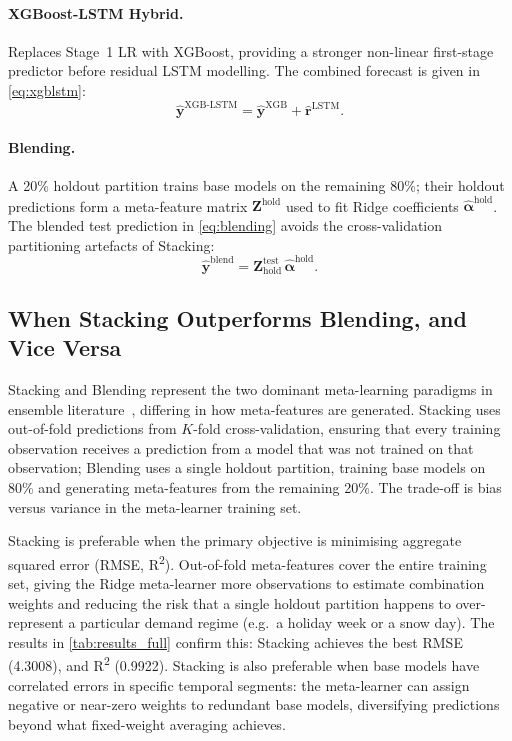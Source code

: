 \paragraph{XGBoost-LSTM Hybrid.} Replaces Stage~1 LR with XGBoost, providing a stronger non-linear first-stage predictor before residual LSTM modelling. The combined forecast is given in \eqref{eq:xgblstm}:
\begin{equation}
 \hat{\mathbf{y}}^{\text{XGB-LSTM}} = \hat{\mathbf{y}}^{\text{XGB}} + \hat{\mathbf{r}}^{\text{LSTM}}.
 \label{eq:xgblstm}
\end{equation}

\paragraph{Blending.} A 20\% holdout partition trains base models on the remaining 80\%; their holdout predictions form a meta-feature matrix $\mathbf{Z}^{\text{hold}}$ used to fit Ridge coefficients $\boldsymbol{\hat{\alpha}}^{\text{hold}}$. The blended test prediction in \eqref{eq:blending} avoids the cross-validation partitioning artefacts of Stacking:
\begin{equation}
 \hat{\mathbf{y}}^{\text{blend}} = \mathbf{Z}^{\text{test}}_{\text{hold}}\,\boldsymbol{\hat{\alpha}}^{\text{hold}}.
 \label{eq:blending}
\end{equation}

\subsection{When Stacking Outperforms Blending, and Vice Versa}

Stacking and Blending represent the two dominant meta-learning paradigms in ensemble literature~\parencite{wolpert1992stacking}, differing in how meta-features are generated. Stacking uses out-of-fold predictions from $K$-fold cross-validation, ensuring that every training observation receives a prediction from a model that was not trained on that observation; Blending uses a single holdout partition, training base models on 80\% and generating meta-features from the remaining 20\%. The trade-off is bias versus variance in the meta-learner training set.

Stacking is preferable when the primary objective is minimising aggregate squared error (RMSE, R\textsuperscript{2}). Out-of-fold meta-features cover the entire training set, giving the Ridge meta-learner more observations to estimate combination weights and reducing the risk that a single holdout partition happens to over-represent a particular demand regime (e.g.\ a holiday week or a snow day). The results in \autoref{tab:results_full} confirm this: Stacking achieves the best RMSE (4.3008), and R\textsuperscript{2} (0.9922). Stacking is also preferable when base models have correlated errors in specific temporal segments: the meta-learner can assign negative or near-zero weights to redundant base models, diversifying predictions beyond what fixed-weight averaging achieves.

